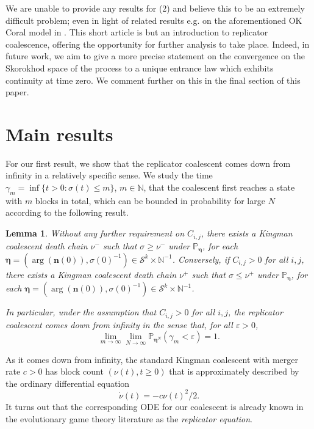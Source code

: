 \documentclass[12pt, leqno]{article}
\newtheorem{lemma}{Lemma}
\begin{document}
We are unable to provide any results for (2) and believe this to be an extremely difficult problem; even in light of related results e.g. on the aforementioned OK Coral model in \cite{King, Vking, Vking2}. This short article is but an introduction to replicator coalescence, offering the opportunity for further analysis to take place. Indeed, in future work, we aim to give a more precise statement on the convergence on the Skorokhod space of the process to a unique entrance law which exhibits continuity at time zero. We comment further on this in the final section of this paper.
\section{Main results}

For our first result, we show that the replicator coalescent comes down from infinity in a relatively specific sense. We study the time $\gamma_m = \inf\{ t> 0 : \sigma(t) \leq m\}$, $m\in\mathbb{N}$, that the coalescent first reaches a state with $m$ blocks in total, which can be bounded in probability for large $N$ according to the following result. 


\begin{lemma}\label{comingdownfrominfinity}
Without any further requirement on $C_{i,j}$, there exists a Kingman coalescent death chain $\nu^-$ such that $\sigma\geq \nu^-$ under $\mathbb{P}_{\bm\eta}$, for each ${\bm \eta} = (\arg({\bm n}(0)), \sigma(0)^{-1})\in \mathcal{S}^k\times \mathbb{N}^{-1}$. 
Conversely, if $C_{i,j}>0$ for all $i,j$, there exists a Kingman coalescent death chain $\nu^+$ such that $\sigma\leq \nu^+$ under $\mathbb{P}_{\bm\eta}$, for each ${\bm \eta} = (\arg({\bm n}(0)), \sigma(0)^{-1})\in \mathcal{S}^k\times \mathbb{N}^{-1}$. 

In particular, under the  assumption that $C_{i,j}>0$ for all $i,j$,
the replicator coalescent comes down from infinity  in the sense that, for all $\varepsilon>0$, 
\[
\lim_{m\to\infty}\lim_{N\to\infty}\mathbb{P}_{\bm\eta^N}(\gamma_m<\varepsilon) = 1.
\]
\end{lemma}

As it comes down from infinity, the standard Kingman coalescent with merger rate $c>0$ has block count $(\nu(t), t\geq0)$ that is approximately described by the ordinary differential equation
\begin{equation}
\dot \nu(t)=-c\nu(t)^2/2.
\label{Kode}
\end{equation}
  It turns out that the corresponding ODE for our coalescent is already known in the evolutionary game theory literature as the {\it replicator equation}.
\medskip
\end{document}
